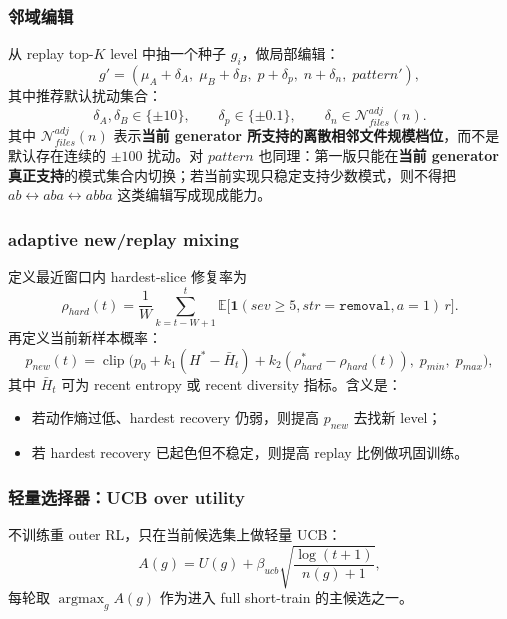 \documentclass[11pt,a4paper]{ctexart}
\newcommand{\E}{\mathbb{E}}
\newcommand{\I}{\mathbf{1}}
\newcommand{\clip}{\operatorname{clip}}
\newcommand{\argmax}{\operatorname*{argmax}}
\begin{document}
\subsubsection*{邻域编辑}
从 replay top-\(K\) level 中抽一个种子 \(g_i\)，做局部编辑：
\begin{equation}
 g' = (\mu_A+\delta_A,\; \mu_B+\delta_B,\; p+\delta_p,\; n+\delta_n,\; pattern'),
\label{eq:edit}
\end{equation}
其中推荐默认扰动集合：
\[
\delta_A,\delta_B\in\{\pm 10\},\qquad \delta_p\in\{\pm 0.1\},\qquad \delta_n\in\mathcal{N}^{adj}_{files}(n).
\]
其中 \(\mathcal{N}^{adj}_{files}(n)\) 表示\textbf{当前 generator 所支持的离散相邻文件规模档位}，而不是默认存在连续的 \(\pm 100\) 扰动。对 \(pattern\) 也同理：第一版只能在\textbf{当前 generator 真正支持}的模式集合内切换；若当前实现只稳定支持少数模式，则不得把 \(ab\leftrightarrow aba\leftrightarrow abba\) 这类编辑写成现成能力。

\subsubsection*{adaptive new/replay mixing}
定义最近窗口内 hardest-slice 修复率为
\begin{equation}
\rho_{hard}(t)=\frac{1}{W}\sum_{k=t-W+1}^{t} \E\big[\I(sev\ge 5, str=\texttt{removal}, a=1)\,r\big].
\label{eq:rhohard}
\end{equation}
再定义当前新样本概率：
\begin{equation}
p_{new}(t)=\clip\Big(p_0 + k_1(H^*-\bar H_t)+k_2(\rho_{hard}^*-\rho_{hard}(t)),\; p_{min},\; p_{max}\Big),
\label{eq:pnew}
\end{equation}
其中 \(\bar H_t\) 可为 recent entropy 或 recent diversity 指标。含义是：
\begin{itemize}[leftmargin=2.2em,itemsep=0.2em]
    \item 若动作熵过低、hardest recovery 仍弱，则提高 \(p_{new}\) 去找新 level；
    \item 若 hardest recovery 已起色但不稳定，则提高 replay 比例做巩固训练。
\end{itemize}

\subsubsection*{轻量选择器：UCB over utility}
不训练重 outer RL，只在当前候选集上做轻量 UCB：
\begin{equation}
A(g)=U(g)+\beta_{ucb}\sqrt{\frac{\log(t+1)}{n(g)+1}},
\label{eq:ucb}
\end{equation}
每轮取 \(\argmax_g A(g)\) 作为进入 full short-train 的主候选之一。
\end{document}

